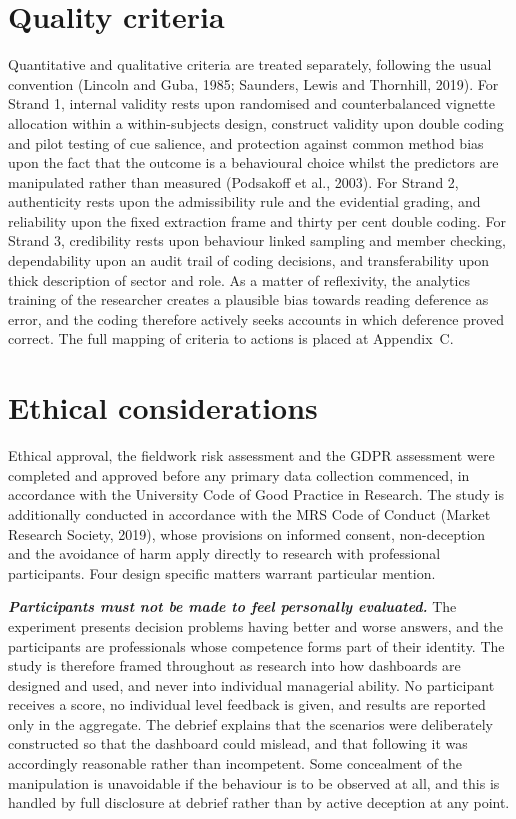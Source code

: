 \documentclass[12pt,a4paper]{article}
\begin{document}
\section{Quality criteria}

Quantitative and qualitative criteria are treated separately, following the usual convention
(Lincoln and Guba, 1985; Saunders, Lewis and Thornhill, 2019). For Strand 1, internal validity
rests upon randomised and counterbalanced vignette allocation within a within-subjects design,
construct validity upon double coding and pilot testing of cue salience, and protection against
common method bias upon the fact that the outcome is a behavioural choice whilst the predictors
are manipulated rather than measured (Podsakoff et al., 2003). For Strand 2, authenticity rests
upon the admissibility rule and the evidential grading, and reliability upon the fixed extraction
frame and thirty per cent double coding. For Strand 3, credibility rests upon behaviour linked
sampling and member checking, dependability upon an audit trail of coding decisions, and
transferability upon thick description of sector and role. As a matter of reflexivity, the
analytics training of the researcher creates a plausible bias towards reading deference as error,
and the coding therefore actively seeks accounts in which deference proved correct. The full
mapping of criteria to actions is placed at Appendix~C.

\section{Ethical considerations}

Ethical approval, the fieldwork risk assessment and the GDPR assessment were completed and approved before
any primary data collection commenced, in accordance with the University Code of Good Practice in Research.
The study is additionally conducted in accordance with the MRS Code of Conduct (Market Research Society,
2019), whose provisions on informed consent, non-deception and the avoidance of harm apply directly to
research with professional participants. Four design specific matters warrant particular mention.

\textbf{\emph{Participants must not be made to feel personally evaluated.}} The experiment
presents decision problems having better and worse answers, and the participants are professionals
whose competence forms part of their identity. The study is therefore framed throughout as
research into how dashboards are designed and used, and never into individual managerial ability.
No participant receives a score, no individual level feedback is given, and results are reported
only in the aggregate. The debrief explains that the scenarios were deliberately constructed so
that the dashboard could mislead, and that following it was accordingly reasonable rather than
incompetent. Some concealment of the manipulation is unavoidable if the behaviour is to be
observed at all, and this is handled by full disclosure at debrief rather than by active deception
at any point.
\end{document}
